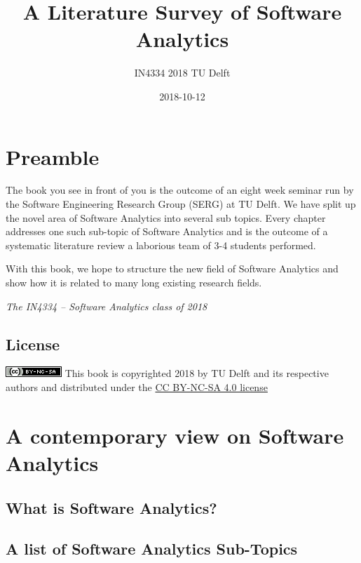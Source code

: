 \documentclass[]{book}
\title{A Literature Survey of Software Analytics}
\author{IN4334 2018 TU Delft}
\date{2018-10-12}
\begin{document}
\maketitle

{
\setcounter{tocdepth}{1}
\tableofcontents
}
\chapter{Preamble}\label{intro}

The book you see in front of you is the outcome of an eight week seminar
run by the Software Engineering Research Group (SERG) at TU Delft. We
have split up the novel area of Software Analytics into several sub
topics. Every chapter addresses one such sub-topic of Software Analytics
and is the outcome of a systematic literature review a laborious team of
3-4 students performed.

With this book, we hope to structure the new field of Software Analytics
and show how it is related to many long existing research fields.

\emph{The IN4334 -- Software Analytics class of 2018}

\section{License}\label{license}

\includegraphics{figures/cc-nc-sa.png} This book is copyrighted 2018 by
TU Delft and its respective authors and distributed under the
\href{https://creativecommons.org/licenses/by-nc-sa/4.0/}{CC BY-NC-SA
4.0 license}

\chapter{A contemporary view on Software
Analytics}\label{a-contemporary-view-on-software-analytics}

\section{What is Software Analytics?}\label{what-is-software-analytics}

\section{A list of Software Analytics
Sub-Topics}\label{a-list-of-software-analytics-sub-topics}
\end{document}
